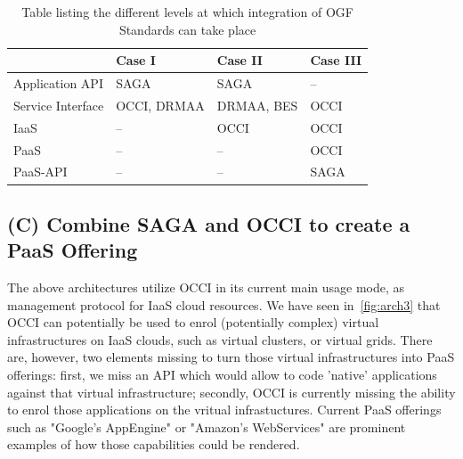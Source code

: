 \documentclass[10pt,conference,final,letterpaper,twoside,twocolumn,]{IEEEtran}
\newcommand{\T}[1]{\texttt{#1}}
\newcommand{\B}[1]{\textbf{#1}}
\begin{document}




\begin{table}
\centering
\begin{tabular}{|l|l|l|l|}
\hline
                  & \B{Case I}  & \B{Case II} & \B{Case III} \\\hline
Application API   & SAGA        & SAGA        & --           \\\hline
Service Interface & OCCI, DRMAA & DRMAA, BES  & OCCI         \\\hline
IaaS              & --          & OCCI        & OCCI         \\\hline
PaaS              & --          & --          & OCCI         \\\hline
PaaS-API          & --          & --          & SAGA         \\\hline
\end{tabular}
\caption{Table listing the different levels at which integration of 
  OGF Standards can take place}
\label{table:standard-function}
\end{table}


 \subsection{(C) Combine SAGA and OCCI to create a PaaS Offering}

 The above architectures utilize OCCI in its current main usage mode,
 as management protocol for IaaS cloud resources.  We have seen
 in~\ref{fig:arch3} that OCCI can potentially be used to enrol
 (potentially complex) virtual infrastructures on IaaS clouds, such as
 virtual clusters, or virtual grids.  There are, however, two elements
 missing to turn those virtual infrastructures into PaaS offerings:
 first, we miss an API which would allow to code 'native' applications
 against that virtual infrastructure; secondly, OCCI is currently
 missing the ability to enrol those applications on the vritual
 infrastuctures.  Current PaaS offerings such as "Google's AppEngine" or
 "Amazon's WebServices" are prominent examples of how those
 capabilities could be rendered.
\end{document}
